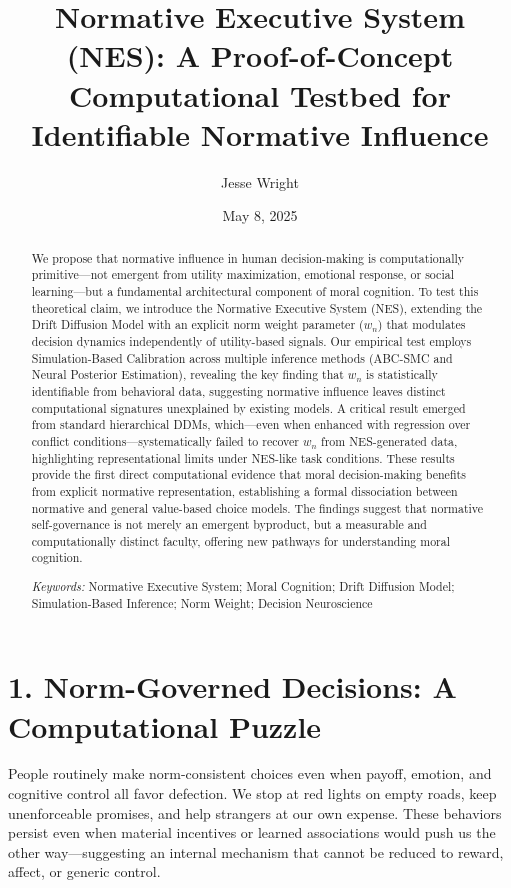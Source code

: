 \documentclass[
  11pt,
]{article}
\title{Normative Executive System (NES): A Proof-of-Concept
Computational Testbed for Identifiable Normative Influence}
\author{Jesse Wright}
\date{May 8, 2025}
\begin{document}
\maketitle
\begin{abstract}
We propose that normative influence in human decision-making is
computationally primitive---not emergent from utility maximization,
emotional response, or social learning---but a fundamental architectural
component of moral cognition. To test this theoretical claim, we
introduce the Normative Executive System (NES), extending the Drift
Diffusion Model with an explicit norm weight parameter (\(w_n\)) that
modulates decision dynamics independently of utility-based signals. Our
empirical test employs Simulation-Based Calibration across multiple
inference methods (ABC-SMC and Neural Posterior Estimation), revealing
the key finding that \(w_n\) is statistically identifiable from
behavioral data, suggesting normative influence leaves distinct
computational signatures unexplained by existing models. A critical
result emerged from standard hierarchical DDMs, which---even when
enhanced with regression over conflict conditions---systematically
failed to recover \(w_n\) from NES-generated data, highlighting
representational limits under NES-like task conditions. These results
provide the first direct computational evidence that moral
decision-making benefits from explicit normative representation,
establishing a formal dissociation between normative and general
value-based choice models. The findings suggest that normative
self-governance is not merely an emergent byproduct, but a measurable
and computationally distinct faculty, offering new pathways for
understanding moral cognition.

\emph{Keywords:} Normative Executive System; Moral Cognition; Drift
Diffusion Model; Simulation-Based Inference; Norm Weight; Decision
Neuroscience
\end{abstract}

\newpage

\section{1. Norm-Governed Decisions: A Computational
Puzzle}\label{norm-governed-decisions-a-computational-puzzle}

People routinely make norm-consistent choices even when payoff, emotion,
and cognitive control all favor defection. We stop at red lights on
empty roads, keep unenforceable promises, and help strangers at our own
expense. These behaviors persist even when material incentives or
learned associations would push us the other way---suggesting an
internal mechanism that cannot be reduced to reward, affect, or generic
control.
\end{document}
